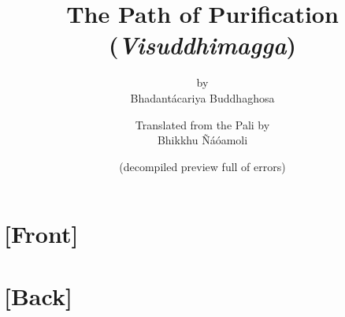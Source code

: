 \documentclass[a4paper]{book}
\newif\ifplastex\plastexfalse
\def\frontmatter{\setcounter{part}{-1}\part{[Front]}} %
\def\backmatter{\setcounter{part}{-1}\part{[Back]}}
\begin{document}
	\title{The Path of Purification \\ (\emph{Visuddhimagga})}
	\date{(decompiled preview full of errors)}
	\author{
		by \ifplastex\else\\\fi Bhadantácariya Buddhaghosa
		\ifplastex\\\else\and\fi
		Translated from the Pali by \ifplastex\else\\\fi Bhikkhu Ñáóamoli
	}
	\maketitle
	\frontmatter
		\tableofcontents
		
	\backmatter
		
		
		
\end{document}
